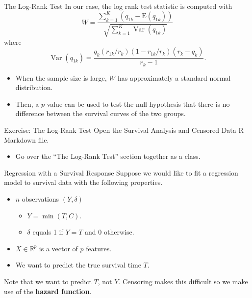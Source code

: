 \documentclass[
  ignorenonframetext,
  aspectratio=169,
]{beamer}
\providecommand{\tightlist}{%
  \setlength{\itemsep}{0pt}\setlength{\parskip}{0pt}}\usepackage{longtable,booktabs,array}
\begin{document}
\begin{frame}{The Log-Rank Test}
\protect\hypertarget{the-log-rank-test-3}{}
In our case, the log rank test statistic is computed with \[
W=\frac{\sum_{k=1}^{K}\left(q_{1 k}-\mathrm{E}\left(q_{1 k}\right)\right)}{\sqrt{\sum_{k=1}^{K} \operatorname{Var}\left(q_{1 k}\right)}}
\] where \[
\operatorname{Var}\left(q_{1 k}\right)=\frac{q_{k}\left(r_{1 k} / r_{k}\right)\left(1-r_{1 k} / r_{k}\right)\left(r_{k}-q_{k}\right)}{r_{k}-1}.
\]

\begin{itemize}
\item
  When the sample size is large, \(W\) has approximately a standard
  normal distribution.
\item
  Then, a \(p\)-value can be used to test the null hypothesis that there
  is no difference between the survival curves of the two groups.
\end{itemize}
\end{frame}

\begin{frame}{Exercise: The Log-Rank Test}
\protect\hypertarget{exercise-the-log-rank-test}{}
Open the Survival Analysis and Censored Data R Markdown file.

\begin{itemize}
\tightlist
\item
  Go over the ``The Log-Rank Test'' section together as a class.
\end{itemize}
\end{frame}

\begin{frame}{Regression with a Survival Response}
\protect\hypertarget{regression-with-a-survival-response}{}
Suppose we would like to fit a regression model to survival data with
the following properties.

\begin{itemize}
\item
  \(n\) observations \((Y, \delta)\)

  \begin{itemize}
  \item
    \(Y = \min (T, C)\).
  \item
    \(\delta\) equals 1 if \(Y = T\) and 0 otherwise.
  \end{itemize}
\item
  \(X \in \mathbb{R}^p\) is a vector of \(p\) features.
\item
  We want to predict the true survival time \(T\).
\end{itemize}

Note that we want to predict \(T\), not \(Y\). Censoring makes this
difficult so we make use of the \textbf{hazard function}.
\end{frame}
\end{document}
